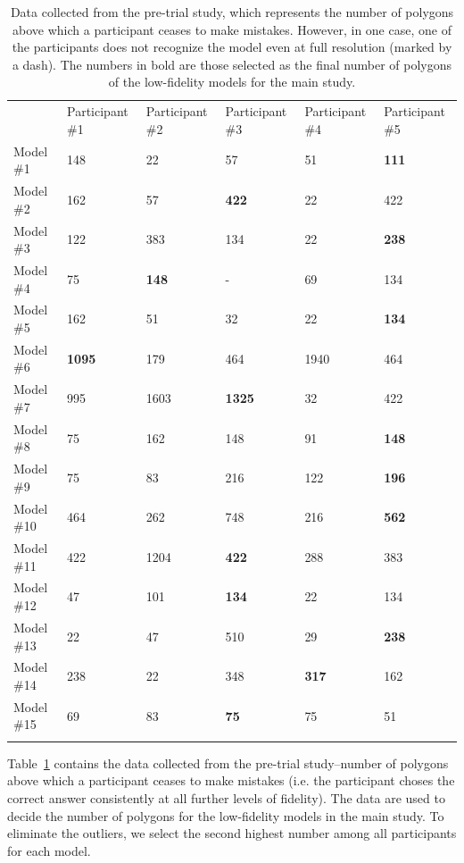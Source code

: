 \begin{table}[!htbp]
\caption{Data collected from the pre-trial study, which represents the number of polygons above which a participant ceases to make mistakes. However, in one case, one of the participants does not recognize the model even at full resolution (marked by a dash). The numbers in bold are those selected as the final number of polygons of the low-fidelity models for the main study.}
\label{tab:pts}
\begin{tabular}{llllll}
\hline\noalign{\smallskip}
& Participant \#1 & Participant \#2 & Participant \#3 & Participant \#4 & Participant \#5 \\
\noalign{\smallskip}\hline\noalign{\smallskip}
Model \#1 & 148 & 22 & 57 & 51 & \textbf{111} \\
Model \#2 & 162 & 57 & \textbf{422} & 22 & 422 \\
Model \#3 & 122 & 383 & 134 & 22 & \textbf{238} \\
Model \#4 & 75 & \textbf{148} & - & 69 & 134 \\
Model \#5 & 162 & 51 & 32 & 22 & \textbf{134} \\
Model \#6 & \textbf{1095} & 179 & 464 & 1940 & 464 \\
Model \#7 & 995 & 1603 & \textbf{1325} & 32 & 422 \\
Model \#8 & 75 & 162 & 148 & 91 & \textbf{148} \\
Model \#9 & 75 & 83 & 216 & 122 & \textbf{196} \\
Model \#10 & 464 & 262 & 748 & 216 & \textbf{562} \\
Model \#11 & 422 & 1204 & \textbf{422} & 288 & 383 \\
Model \#12 & 47 & 101 & \textbf{134} & 22 & 134 \\
Model \#13 & 22 & 47 & 510 & 29 & \textbf{238} \\
Model \#14 & 238 & 22 & 348 & \textbf{317} & 162 \\
Model \#15 & 69 & 83 & \textbf{75} & 75 & 51 \\
\noalign{\smallskip}\hline
\end{tabular}
\end{table}

Table~\ref{tab:pts} contains the data collected from the pre-trial study--number of polygons above which a participant ceases to make mistakes (i.e. the participant choses the correct answer consistently at all further levels of fidelity). The data are used to decide the number of polygons for the low-fidelity models in the main study. To eliminate the outliers, we select the second highest number among all participants for each model.

